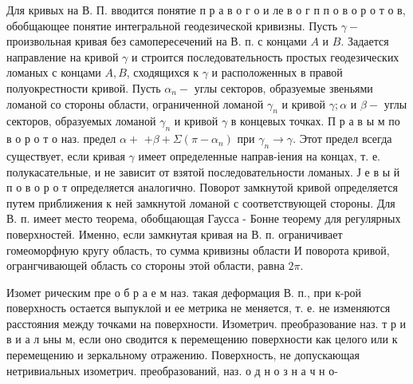 \documentclass[10pt]{article}
\begin{document}
Для кривых на В. П. вводится понятие п р а в о г о и ле в о г п п о в о р о т о в, обобщающее понятие интегральной геодезической кривизны. Пусть $\gamma-$ произвольная кривая без самопересечений на В. п. с концами $A$ и $B$. Задается направление на кривой $\gamma$ и строится последовательность простых геодезических ломаных с концами $A, B$, сходящихся к $\gamma$ и расположенных в правой полуокрестности кривой. Пусть $\alpha_{n}-$ углы секторов, образуемые звеньями ломаной со стороны области, ограниченной ломаной $\gamma_{n}$ и кривой $\gamma ; \alpha$ и $\beta-$ углы секторов, образуемых ломаной $\gamma_{n}$ и кривой $\gamma$ в концевых точках. П р а в ы м по в о р о т о наз. предел $\alpha+$ $+\beta+\Sigma\left(\pi-\alpha_{n}\right)$ при $\gamma_{n} \rightarrow \gamma$. Этот предел всегда существует, если кривая $\gamma$ имеет определенные направ-іения на концах, т. е. полукасательные, и не зависит от взятой последовательности ломаных. Ј е в ы й п о в о р о т определяется аналогично. Поворот замкнутой кривой определяется путем приближения к ней замкнутой ломаной с соответствующей стороны. Для В. п. имеет место теорема, обобщающая Гаусса - Бонне теорему для регулярных поверхностей. Именно, если замкнутая кривая на В. п. ограничивает гомеоморфную кругу область, то сумма кривизны области И поворота кривой, огрангчивающей область со стороны этой области, равна $2 \pi$.



Изомет рическим пре о б р а е м наз. такая деформация В. п., при к-рой поверхность остается выпуклой и ее метрика не меняется, т. е. не изменяются расстояния между точками на поверхности. Изометрич. преобразование наз. т р и в и а л ьны м, если оно сводится к перемещению поверхности как целого или к перемещению и зеркальному отражению. Поверхность, не допускающая нетривиальных изометрич. преобразований, наз. о д н о з н а ч н о-
\end{document}
